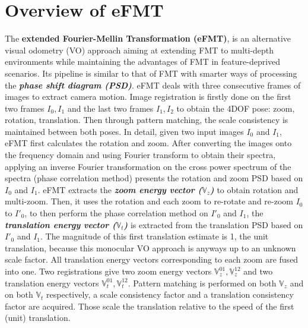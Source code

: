 \documentclass[letterpaper, 10 pt, conference]{ieeeconf}  %
\begin{document}
\section{Overview of eFMT}
The \textbf{extended Fourier-Mellin Transformation (eFMT)}, is an alternative visual odometry (VO) approach aiming at extending FMT to multi-depth environments while maintaining the advantages of FMT in feature-deprived scenarios. Its pipeline is similar to that of FMT \cite{reddy1996fft} with smarter ways of processing the \textbf{\textit{phase shift diagram (PSD)}}. eFMT deals with three consecutive frames of images to extract camera motion. Image registration is firstly done on the first two frames $I_0,I_1$ and the last two frames $I_1,I_2$ to obtain the 4DOF pose: zoom, rotation, translation. Then through pattern matching, the scale consistency is maintained between both poses. In detail, given two input images $I_0$ and $I_1$, eFMT first calculates the rotation and zoom. After converting the images onto the frequency domain and using Fourier transform to obtain their spectra, applying an inverse Fourier transformation on the cross power spectrum of the spectra (phase correlation method) presents the rotation and zoom PSD based on $I_0$ and $I_1$. eFMT extracts the \textbf{\textit{zoom energy vector ($\mathbb{V}_z$)}} to obtain rotation and multi-zoom. Then, it uses the rotation and each zoom to re-rotate and re-zoom $I_0$ to $I'_0$, to then perform the phase correlation method on $I'_0$ and $I_1$, the \textbf{\textit{translation energy vector ($\mathbb{V}_t$)}} is extracted from the translation PSD based on $I'_0$ and $I_1$. The magnitude of this first translation estimate is 1, the unit translation, because this monocular VO approach is anyways up to an unknown scale factor. All translation energy vectors corresponding to each zoom are fused into one. Two registrations give two zoom energy vectors $\mathbb{V}_z^{01}, \mathbb{V}_z^{12}$ and two translation energy vectors $\mathbb{V}_t^{01}, \mathbb{V}_t^{12}$. Pattern matching is performed on both $\mathbb{V}_z$ and on both $\mathbb{V}_t$ respectively, a scale consistency factor and a translation consistency factor are acquired. Those scale the translation relative to the speed of the first (unit) translation.  

\end{document}
